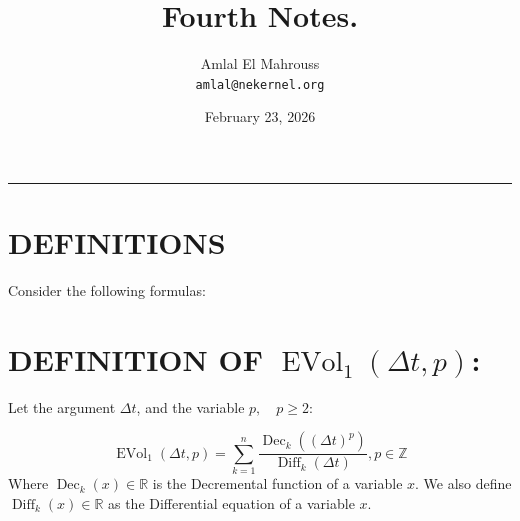 \documentclass[11pt, a4paper]{article}
\title{Fourth Notes.}
\author{Amlal El Mahrouss\\\texttt{amlal@nekernel.org}}
\date{February 23, 2026}
\begin{document}
\maketitle

\begin{center}
	\rule[0.01cm]{17cm}{0.01cm}
\end{center}

\section{DEFINITIONS}

Consider the following formulas: 

\section{DEFINITION OF $\operatorname{EVol}_{1}(\Delta t, p)$:}

Let the argument $\Delta t$, and the variable $p, \quad p \geq 2$:

\begin{equation}
    \operatorname{EVol}_{1}(\Delta t, p) = \sum_{k=1}^{n} \frac{\operatorname{Dec}_{k}((\Delta t)^{p})}{\operatorname{Diff}_{k}(\Delta t)}, p \in \mathbb{Z}
\end{equation}
Where $\operatorname{Dec}_{k}(x) \in \mathbb{R}$ is the Decremental function of a variable $x$. We also define $\operatorname{Diff}_{k}(x) \in \mathbb{R}$ as the Differential equation of a variable $x$.
\end{document}
